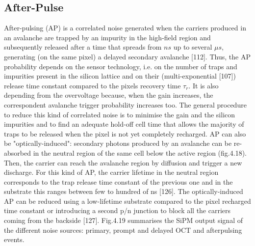\subsection{After-Pulse}
After-pulsing (AP) is a correlated noise generated when the carriers produced in an avalanche are trapped by an impurity in the high-field region and subsequently released after a time that spreads from $ns$ up to several $\mu s$, generating (on the same pixel) a delayed secondary avalanche [112].
Thus, the AP probability depends on the sensor technology, i.e. on the number of traps and impurities present in the silicon lattice and on their (multi-exponential [107]) release time constant compared to the pixels recovery time $\tau_r$.
It is also depending from the overvoltage because, when the gain increases, the correspondent avalanche trigger probability increases too.
The general procedure to reduce this kind of correlated noise is to minimise the gain and the silicon impurities and to find an adequate hold-off cell time that allows the majority of traps to be released when the pixel is not yet completely recharged.
AP can also be "optically-induced": secondary photons produced by an avalanche can be re-absorbed in the neutral region of the same cell below the active region (fig.4.18).
Then, the carrier can reach the avalanche region by diffusion and trigger a new discharge.
For this kind of AP, the carrier lifetime in the neutral region corresponds to the trap release time constant of the previous one and in the substrate this ranges between few to hundred of ns [126].
The optically-induced AP can be reduced using a low-lifetime substrate compared to the pixel recharged time constant or introducing a second p/n junction to block all the carriers coming from the backside [127].
Fig.4.19 summarises the SiPM output signal of the different noise sources: primary, prompt and delayed OCT and afterpulsing events.


